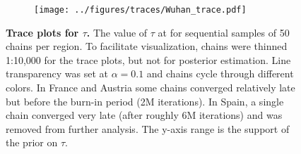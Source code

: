 \documentclass[12pt]{extarticle}
\begin{document}
\begin{figure}[p]
\begin{subfigure}{0.32\textwidth}
        \texttt{[image: ../figures/traces/Wuhan\_trace.pdf]}
    \end{subfigure}
    \caption{
    \textbf{Trace plots for $\tau$.}
    The value of $\tau$ at for sequential samples of 50 chains per region. To facilitate visualization, chains were thinned 1:10,000 for the trace plots, but not for posterior estimation. Line transparency was set at $\alpha=0.1$ and chains cycle through different colors. In France and Austria some chains converged relatively late but before the burn-in period (2M iterations). In Spain, a single chain converged very late (after roughly 6M iterations) and was removed from further analysis. The y-axis range is the support of the prior on $\tau$.  
    }
    \label{fig:trace}	    
\end{figure}
\end{document}
